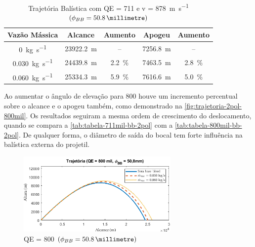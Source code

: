 \begin{table}[!ht]
\centering
\caption[Trajetória Balística com QE = \qty{711}{\milliradian} e v = \qty{878}{\metre\per\second} \(\left(\phi_{BB} = \qty{50,8}{\millimetre}\right)\)]{Trajetória Balística com QE = \qty{711}{\milliradian} e v = \qty{878}{\metre\per\second} \(\left(\phi_{BB} = \qty{50,8}{\millimetre}\right)\)}
\vspace{0.5cm}
\begin{tabular}{c|c|c|c|c}
Vazão Mássica & Alcance & Aumento & Apogeu & Aumento \\
\hline
\qty{0}{\kilogram\per\second} & \qty{23922,2}{\metre} & -- & \qty{7256,8}{\metre} & -- \\
\qty{0,030}{\kilogram\per\second} & \qty{24439,8}{\metre} & \qty{2,2}{\percent} & \qty{7463,5}{\metre} & \qty{2,8}{\percent} \\
\qty{0,060}{\kilogram\per\second} & \qty{25334,3}{\metre} & \qty{5,9}{\percent} & \qty{7616,6}{\metre} & \qty{5,0}{\percent}
\end{tabular}
\label{tab:tabela-711mil-bb-2pol}
\end{table}

Ao aumentar o ângulo de elevação para \qty{800}{\milliradian} houve um incremento percentual sobre o alcance e o apogeu também, como demonstrado na \autoref{fig:trajetoria-2pol-800mil}. Os resultados seguiram a mesma ordem de crescimento do deslocamento, quando se compara a \autoref{tab:tabela-711mil-bb-2pol} com a \autoref{tab:tabela-800mil-bb-2pol}. De qualquer forma, o diâmetro de saída do bocal tem forte influência na balística externa do projetil.

\begin{figure}[!ht]
	\centering
    \includegraphics[width=0.7\textwidth]{foto4-qe800mil-2pol.png}
    \caption[QE = \qty{800}{\milliradian} \(\left(\phi_{BB} = \qty{50,8}{\millimetre}\right)\)]{QE = \qty{800}{\milliradian} \(\left(\phi_{BB} = \qty{50,8}{\millimetre}\right)\)}
    \label{fig:trajetoria-2pol-800mil}
\end{figure}

